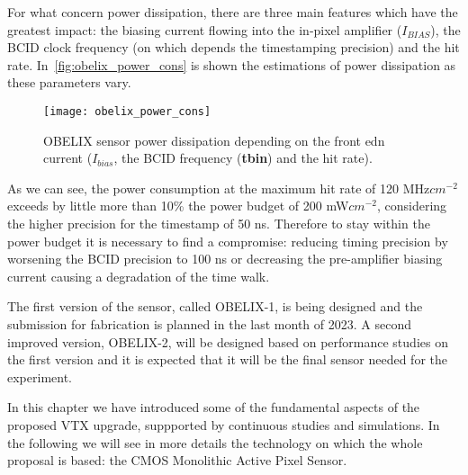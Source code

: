 For what concern power dissipation, there are three main features which have the greatest impact: the biasing current flowing into the in-pixel amplifier (\textit{$I_{BIAS}$}), the BCID clock frequency (on which depends the timestamping precision) and the hit rate. In~\autoref{fig:obelix_power_cons} is shown the estimations of power dissipation as these parameters vary.


\begin{figure}[h!]
\centering
\texttt{[image: obelix\_power\_cons]}
\caption{OBELIX sensor power dissipation depending on the front edn current (\textbf{$I_{bias}$}, the BCID frequency (\textbf{tbin}) and the hit rate).}
\label{fig:obelix_power_cons}
\end{figure}

As we can see, the power consumption at the maximum hit rate of 120 MHz$cm^{-2}$ exceeds by little more than 10\% the power budget of 200 mW$cm^{-2}$, considering the higher precision for the timestamp of 50 ns. Therefore to stay within the power budget it is necessary to find a compromise: reducing timing precision by worsening the BCID precision to 100 ns or decreasing the pre-amplifier biasing current causing a degradation of the time walk.


The first version of the sensor, called OBELIX-1, is being designed and the submission for fabrication is planned in the last month of 2023. A second improved version, OBELIX-2, will be designed based on performance studies on the first version and it is expected that it will be the final sensor needed for the experiment.\\

\bigskip

In this chapter we have introduced some of the fundamental aspects of the proposed VTX upgrade, suppported by continuous studies and simulations. In the following we will see in more details the technology on which the whole proposal is based: the CMOS Monolithic Active Pixel Sensor.


